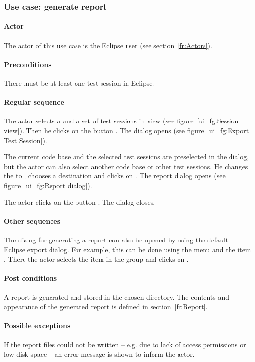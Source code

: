 \subsubsection{Use case: generate report} \label{fr:Use case: generate report}
\paragraph{Actor}
The actor of this use case is the Eclipse user (see section~\ref{fr:Actors}).
\paragraph{Preconditions}
There must be at least one test session in Eclipse.
\paragraph{Regular sequence}
The actor selects a  and a set of test sessions in  view (see figure~\ref{ui_fg:Session view}). Then he clicks on the button . The  dialog opens (see figure~\ref{ui_fg:Export Test Session}).
\par
The current code base and the selected test sessions are preselected in the dialog, but the actor can also select another code base or other test sessions. He changes the  to , chooses a destination and clicks on . The report dialog opens (see figure~\ref{ui_fg:Report dialog}).
\par
The actor clicks on the button . The dialog closes.
\paragraph{Other sequences}
The dialog for generating a report can also be opened by using the default Eclipse export dialog. For example, this can be done using the menu  and the item . There the actor selects the item  in the group  and clicks on .
\paragraph{Post conditions}
A report is generated and stored in the chosen directory. The contents and appearance of the generated report is defined in section~\ref{fr:Report}.
\paragraph{Possible exceptions}
If the report files could not be written -- e.g. due to lack of access permissions or low disk space -- an error message is shown to inform the actor.

